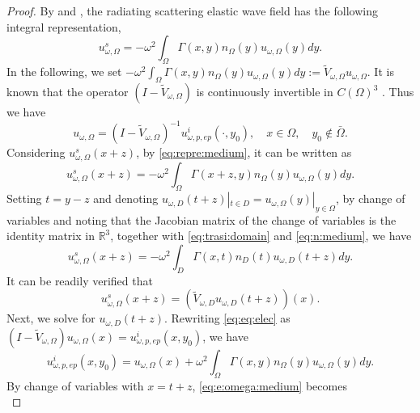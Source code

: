 \documentclass[a4paper,11pt]{article}
\theoremstyle{remark}
\theoremstyle{definition}
\numberwithin{equation}{section}
\begin{document}
\begin{proof}
By \cite[Lemma 2]{PH0} and \cite[Lemma 5.7 ]{PHhab}, the radiating scattering elastic wave field has the following
integral representation,
\begin{equation}\label{eq:repre:medium}
u_{\omega,\Omega}^{s}=  -\omega^2 \int_{\Omega}\Gamma(x,y)n_{\Omega}(y)u_{\omega,\Omega}(y)dy.
\end{equation}
In the following, we set $-\omega^2 \int_{\Omega}\Gamma(x,y)n_{\Omega}(y)u_{\omega,\Omega}(y)dy:= \tilde{V}_{\omega,\Omega}u_{\omega,\Omega}$.
It is known that the operator $(I -\tilde{V}_{\omega,\Omega} )$ is continuously invertible in $C(\Omega)^3$ \cite{PHhab}. Thus we have
\begin{equation}\label{eq:eq:elec}
u_{\omega,\Omega}  = (I - \tilde{V}_{\omega,\Omega})^{-1}u_{\omega,p,ep}^{i}(\cdot, y_0),\quad x \in \Omega, \quad y_0 \notin \bar \Omega.
\end{equation}
Considering $u_{\omega,\Omega}^s(x+z)$, by \eqref{eq:repre:medium}, it can be written as
\[
u_{\omega,\Omega}^s(x+z)= -\omega^2 \int_{\Omega}\Gamma(x+z,y)n_{\Omega}(y)u_{\omega,\Omega}(y)dy.
\]
Setting $t=y-z$ and denoting $u_{\omega,D}(t+z)|_{t \in D}= u_{\omega,\Omega}(y)|_{y \in \Omega}$, by change of variables and noting that the Jacobian matrix of the change of variables is the identity matrix in $\mathbb{R}^3$, together with \eqref{eq:trasi:domain} and \eqref{eq:n:medium}, we have
\begin{equation*}
u_{\omega,\Omega}^s(x+z)  =  -\omega^2 \int_{D}\Gamma(x,t)n_{D}(t)u_{\omega,D}(t+z)dy.
\end{equation*}
It can be readily verified that
\begin{equation}\label{eq:e:omega:z}
u_{\omega,\Omega}^s(x+z)  =  (\tilde{V}_{\omega,D} u_{\omega,D}(t+z))(x).
\end{equation}
Next, we solve for $u_{\omega,D}(t+z)$. Rewriting \eqref{eq:eq:elec} as $(I - \tilde{V}_{\omega,\Omega})u_{\omega,\Omega}(x)  = u_{\omega,p,ep}^{i}(x,y_0)$, we have
\begin{equation}\label{eq:e:omega:medium}
u_{\omega,p,ep}^{i}(x,y_0)=u_{\omega,\Omega}(x) + \omega^2 \int_{\Omega}\Gamma(x,y)n_{\Omega}(y)u_{\omega, \Omega}(y)dy.
\end{equation}
By change of variables with $x = t+z$, \eqref{eq:e:omega:medium} becomes
\begin{equation}\label{eq:mega:2}

\end{equation}
\end{proof}
\end{document}
